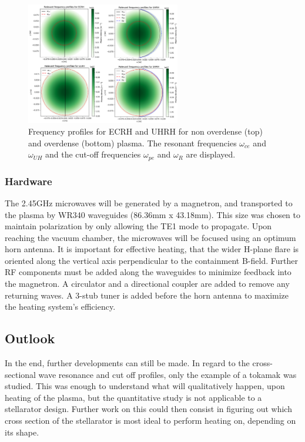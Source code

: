 \begin{figure}[H]
  \centering
  \includegraphics[width=0.6\textwidth]{Images/05_Heating/freq_profiles.png}
  \caption{Frequency profiles for ECRH and UHRH for non overdense (top) and overdense (bottom) plasma. The resonant frequencies $\omega_{ce}$ and $\omega_{UH}$ and the cut-off frequencies $\omega_{pe}$ and $\omega_R$ are displayed.}
  \label{fig:freq_profiles}
\end{figure}




\subsubsection{Hardware}    %

The 2.45GHz microwaves will be generated by a magnetron, and transported to the plasma by WR340 waveguides (86.36mm x 43.18mm). This size was chosen to maintain polarization by only allowing the TE1 mode to propagate. Upon reaching the vacuum chamber, the microwaves will be focused using an optimum horn antenna. It is important for effective heating, that the wider H-plane flare is oriented along the vertical axis perpendicular to the containment B-field.
Further RF components must be added along the waveguides to minimize feedback into the magnetron. A circulator and a directional coupler are added to remove any returning waves. A 3-stub tuner is added before the horn antenna to maximize the heating system's efficiency.
\subsection{Outlook}
In the end, further developments can still be made.
In regard to the cross-sectional wave resonance and cut off profiles, only the example of a tokamak was studied.
This was enough to understand what will qualitatively happen, upon heating of the plasma, but the quantitative study is not applicable to a stellarator design.
Further work on this could then consist in figuring out which cross section of the stellarator is most ideal to perform heating on, depending on its shape.

